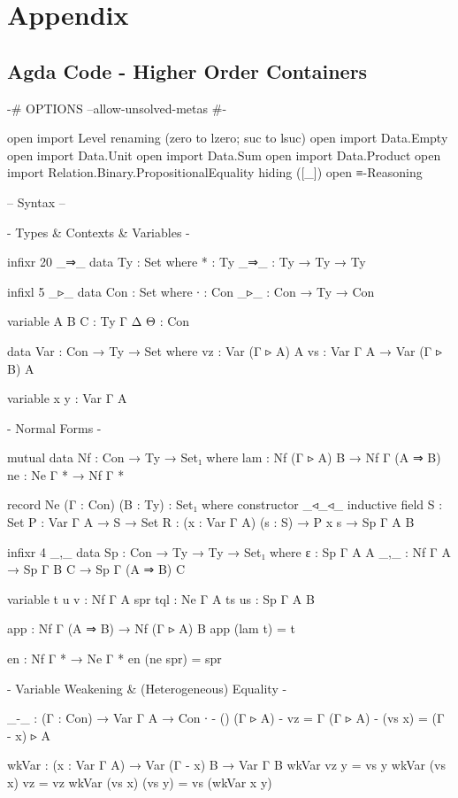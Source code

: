 \chapter{Appendix}

\section{Agda Code - Higher Order Containers}

\begin{code}
{-# OPTIONS --allow-unsolved-metas #-}

open import Level renaming (zero to lzero; suc to lsuc)
open import Data.Empty
open import Data.Unit
open import Data.Sum
open import Data.Product
open import Relation.Binary.PropositionalEquality hiding ([_])
open ≡-Reasoning

{-- Syntax --}
  
{- Types & Contexts & Variables -}

infixr 20 _⇒_
data Ty : Set where
  * : Ty
  _⇒_ : Ty → Ty → Ty

infixl 5 _▹_
data Con : Set where
  ∙   : Con
  _▹_ : Con → Ty → Con

variable
  A B C : Ty
  Γ Δ Θ : Con

data Var : Con → Ty → Set where
  vz : Var (Γ ▹ A) A
  vs : Var Γ A → Var (Γ ▹ B) A

variable
  x y : Var Γ A

{- Normal Forms -}

mutual
  data Nf : Con → Ty → Set₁ where
    lam : Nf (Γ ▹ A) B → Nf Γ (A ⇒ B)
    ne  : Ne Γ * → Nf Γ *

  record Ne (Γ : Con) (B : Ty) : Set₁ where
    constructor _◃_◃_
    inductive
    field
      S : Set
      P : Var Γ A → S → Set
      R : (x : Var Γ A) (s : S) → P x s → Sp Γ A B

  infixr 4 _,_
  data Sp : Con → Ty → Ty → Set₁ where
    ε   : Sp Γ A A
    _,_ : Nf Γ A → Sp Γ B C → Sp Γ (A ⇒ B) C

variable
  t u v : Nf Γ A
  spr tql : Ne Γ A
  ts us : Sp Γ A B

app : Nf Γ (A ⇒ B) → Nf (Γ ▹ A) B
app (lam t) = t

en : Nf Γ * → Ne Γ *
en (ne spr) = spr

{- Variable Weakening & (Heterogeneous) Equality -}

_-_ : (Γ : Con) → Var Γ A → Con
∙ - ()
(Γ ▹ A) - vz = Γ
(Γ ▹ A) - (vs x) = (Γ - x) ▹ A

wkVar : (x : Var Γ A) → Var (Γ - x) B → Var Γ B
wkVar vz y = vs y
wkVar (vs x) vz = vz
wkVar (vs x) (vs y) = vs (wkVar x y)


\end{code}
